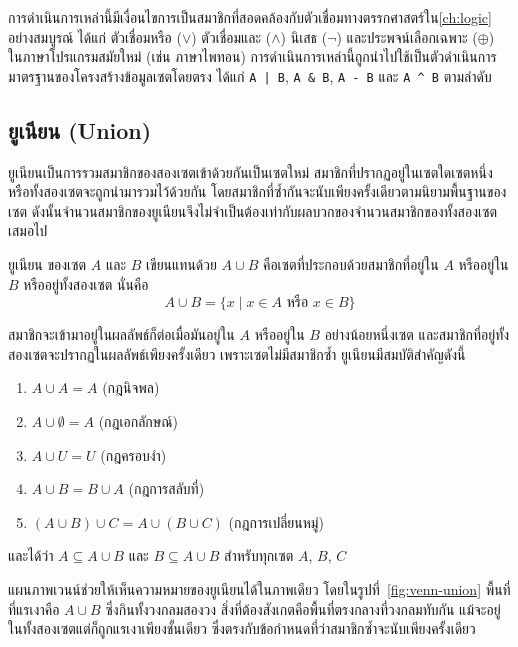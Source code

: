 การดำเนินการเหล่านี้มีเงื่อนไขการเป็นสมาชิกที่สอดคล้องกับตัวเชื่อมทางตรรกศาสตร์ใน\autoref{ch:logic} อย่างสมบูรณ์ ได้แก่ ตัวเชื่อมหรือ ($\lor$) ตัวเชื่อมและ ($\land$) นิเสธ ($\neg$) และประพจน์เลือกเฉพาะ ($\oplus$) ในภาษาโปรแกรมสมัยใหม่ (เช่น ภาษาไพทอน) การดำเนินการเหล่านี้ถูกนำไปใช้เป็นตัวดำเนินการมาตรฐานของโครงสร้างข้อมูลเซตโดยตรง ได้แก่ \texttt{A | B}, \texttt{A \& B}, \texttt{A - B} และ \texttt{A \^{} B} ตามลำดับ~\parencite{enderton1977settheory}

\subsection{ยูเนียน (Union)}
ยูเนียนเป็นการรวมสมาชิกของสองเซตเข้าด้วยกันเป็นเซตใหม่ สมาชิกที่ปรากฏอยู่ในเซตใดเซตหนึ่งหรือทั้งสองเซตจะถูกนำมารวมไว้ด้วยกัน โดยสมาชิกที่ซ้ำกันจะนับเพียงครั้งเดียวตามนิยามพื้นฐานของเซต ดังนั้นจำนวนสมาชิกของยูเนียนจึงไม่จำเป็นต้องเท่ากับผลบวกของจำนวนสมาชิกของทั้งสองเซตเสมอไป~\parencite{lipschutz1998settheory}

\begin{definition}[ยูเนียน]
ยูเนียน ของเซต $A$ และ $B$ เขียนแทนด้วย $A \cup B$ คือเซตที่ประกอบด้วยสมาชิกที่อยู่ใน $A$ หรืออยู่ใน $B$ หรืออยู่ทั้งสองเซต นั่นคือ
\[ A \cup B = \{x \mid x \in A \text{ หรือ } x \in B\} \]
\label{def:union}
\end{definition}

สมาชิกจะเข้ามาอยู่ในผลลัพธ์ก็ต่อเมื่อมันอยู่ใน $A$ หรืออยู่ใน $B$ อย่างน้อยหนึ่งเซต และสมาชิกที่อยู่ทั้งสองเซตจะปรากฏในผลลัพธ์เพียงครั้งเดียว เพราะเซตไม่มีสมาชิกซ้ำ ยูเนียนมีสมบัติสำคัญดังนี้
\begin{enumerate}
    \item $A \cup A = A$ (กฎนิจพล)
    \item $A \cup \emptyset = A$ (กฎเอกลักษณ์)
    \item $A \cup U = U$ (กฎครอบงำ)
    \item $A \cup B = B \cup A$ (กฎการสลับที่)
    \item $(A \cup B) \cup C = A \cup (B \cup C)$ (กฎการเปลี่ยนหมู่)
\end{enumerate}
และได้ว่า $A \subseteq A \cup B$ และ $B \subseteq A \cup B$ สำหรับทุกเซต $A$, $B$, $C$

แผนภาพเวนน์ช่วยให้เห็นความหมายของยูเนียนได้ในภาพเดียว โดยในรูปที่~\ref{fig:venn-union} พื้นที่ที่แรเงาคือ $A \cup B$ ซึ่งกินทั้งวงกลมสองวง สิ่งที่ต้องสังเกตคือพื้นที่ตรงกลางที่วงกลมทับกัน แม้จะอยู่ในทั้งสองเซตแต่ก็ถูกแรเงาเพียงชั้นเดียว ซึ่งตรงกับข้อกำหนดที่ว่าสมาชิกซ้ำจะนับเพียงครั้งเดียว

